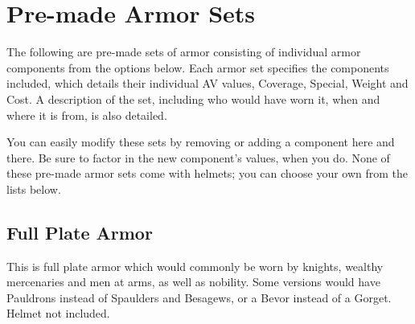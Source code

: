 \documentclass[oneside,11pt,english]{book}
\begin{document}
\section{Pre-made Armor Sets}
The following are pre-made sets of armor consisting of individual armor components from the options below. Each 
armor set specifies the components included, which details their individual AV values, Coverage, Special, Weight and 
Cost. A description of the set, including who would have worn it, when and where it is from, is also detailed. 

You can easily modify these sets by removing or adding a component here and
there. Be sure to factor in the new component’s values, when you do. None of
these pre-made armor sets come with helmets; you can choose your own from the
lists below. 

\subsection*{Full Plate Armor}
This is full plate armor which would commonly be worn by knights, wealthy mercenaries and men at arms, as well as 
nobility. Some versions would have Pauldrons instead of Spaulders and Besagews, or a Bevor instead of a Gorget.
Helmet not included.
\end{document}
